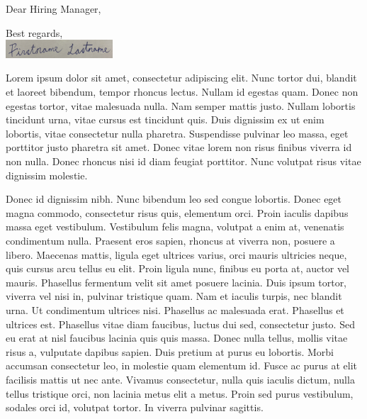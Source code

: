 \documentclass[10pt,letterpaper,sans]{moderncv}        %
\begin{document}
\date{\today}
\opening{Dear Hiring Manager,}
\closing{Best regards,\\
  \includegraphics[width=4cm]{signature.png}  \vspace{-1cm}}

\makelettertitle

Lorem ipsum dolor sit amet, consectetur adipiscing elit. Nunc tortor dui, blandit et laoreet bibendum, tempor rhoncus lectus. Nullam id egestas quam. Donec non egestas tortor, vitae malesuada nulla. Nam semper mattis justo. Nullam lobortis tincidunt urna, vitae cursus est tincidunt quis. Duis dignissim ex ut enim lobortis, vitae consectetur nulla pharetra. Suspendisse pulvinar leo massa, eget porttitor justo pharetra sit amet. Donec vitae lorem non risus finibus viverra id non nulla. Donec rhoncus nisi id diam feugiat porttitor. Nunc volutpat risus vitae dignissim molestie.

\vspace{10pt}

Donec id dignissim nibh. Nunc bibendum leo sed congue lobortis. Donec eget magna commodo, consectetur risus quis, elementum orci. Proin iaculis dapibus massa eget vestibulum. Vestibulum felis magna, volutpat a enim at, venenatis condimentum nulla. Praesent eros sapien, rhoncus at viverra non, posuere a libero. Maecenas mattis, ligula eget ultrices varius, orci mauris ultricies neque, quis cursus arcu tellus eu elit. Proin ligula nunc, finibus eu porta at, auctor vel mauris. Phasellus fermentum velit sit amet posuere lacinia. Duis ipsum tortor, viverra vel nisi in, pulvinar tristique quam. Nam et iaculis turpis, nec blandit urna. Ut condimentum ultrices nisi. Phasellus ac malesuada erat. Phasellus et ultrices est. Phasellus vitae diam faucibus, luctus dui sed, consectetur justo. Sed eu erat at nisl faucibus lacinia quis quis massa. Donec nulla tellus, mollis vitae risus a, vulputate dapibus sapien. Duis pretium at purus eu lobortis. Morbi accumsan consectetur leo, in molestie quam elementum id. Fusce ac purus at elit facilisis mattis ut nec ante. Vivamus consectetur, nulla quis iaculis dictum, nulla tellus tristique orci, non lacinia metus elit a metus. Proin sed purus vestibulum, sodales orci id, volutpat tortor. In viverra pulvinar sagittis.
\end{document}
